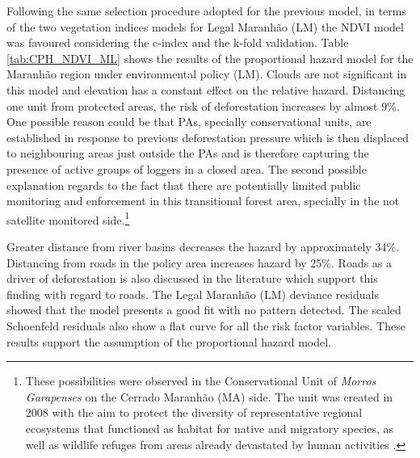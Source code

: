 
Following the same selection procedure adopted for the previous model, in terms of the two vegetation indices models for Legal Maranhão (LM) the NDVI model was favoured considering the c-index and the k-fold validation. Table \ref{tab:CPH_NDVI_ML} shows the results of the proportional hazard model for the Maranhão region under environmental policy (LM). Clouds are not significant in this model and elevation has a constant effect on the relative hazard. Distancing one unit from protected areas, the risk of deforestation increases by almost 9\%. One possible reason could be that PAs, specially conservational units, are established in response to previous deforestation pressure which is then displaced to neighbouring areas just outside the PAs and is therefore capturing the presence of active groups of loggers in a closed area. The second possible explanation regards to the fact that there are potentially limited public monitoring and enforcement in this transitional forest area, specially in the not satellite monitored side.\footnote{These possibilities were observed in the Conservational Unit of \textit{Morros Garapenses} on the Cerrado Maranhão (MA) side. The unit was created in 2008 with the aim to protect the diversity of representative regional ecosystems that functioned as habitat for native and migratory species, as well as wildlife refuges from areas already devastated by human activities \citep{isa_2018}.}  

Greater distance from river basins decreases the hazard by approximately 34\%. Distancing from roads in the policy area increases hazard by 25\%. Roads as a driver of deforestation is also discussed in the literature \citep{CROPPER2, CROPPER1, PFAFF3, BAYNARD} which support this finding with regard to roads. The Legal Maranhão (LM) deviance residuals showed that the model presents a good fit with no pattern detected. The scaled Schoenfeld residuals also show a flat curve for all the risk factor variables. These results support the assumption of the proportional hazard model.

